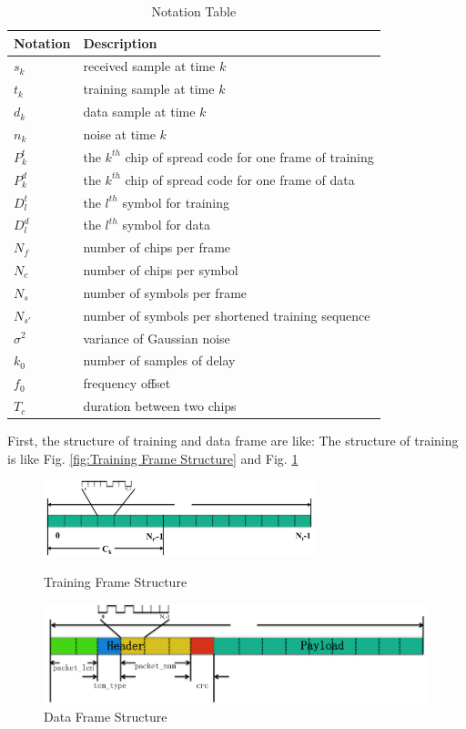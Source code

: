 \documentclass[a4paper]{article}
\begin{document}
\begin{table}[ht]
\centering
\begin{tabular}{l l}
 \toprule
 Notation 	& 	Description\\
 \midrule
 $s_k$		& 	received sample at time $k$\\
 $t_k$		& 	training sample at time $k$\\
 $d_k$		& 	data sample at time $k$\\
 $n_k$		& 	noise at time $k$\\
 $P^t_k$ & 	the $k^{th}$ chip of spread code for one frame of training\\
 $P^d_k$	& 	the $k^{th}$ chip of spread code for one frame of data\\
 $D^t_l$ & 	the $l^{th}$ symbol for training\\
 $D^d_l$ & 	the $l^{th}$ symbol for data\\
 $N_f$ 		& 	number of chips per frame\\
 $N_c$ 		& 	number of chips per symbol\\
 $N_s$		& 	number of symbols per frame\\
 $N_{s'}$ 	& 	number of symbols per shortened training sequence\\
 $\sigma^2$ & 	variance of Gaussian noise\\
 $k_0$ 		& 	number of samples of delay\\
 $f_0$ 		& 	frequency offset\\
 $T_c$ 		& 	duration between two chips\\
 \bottomrule
\end{tabular}
\caption{Notation Table}
\label{Table:Notation Table}
\end{table}

First, the structure of training and data frame are like:
The structure of training is like Fig. \ref{fig:Training Frame Structure} and Fig. \ref{fig:Data Frame Structure}
\begin{figure}[ht]
	\centering
	\includegraphics[width = 3.1in]{figure/training_frame.png}
	\caption{Training Frame Structure}
	\label{fig:Training Frame Structure}
	\includegraphics[width = 3.1 in]{figure/data_frame.png}
	\caption{Data Frame Structure}
	\label{fig:Data Frame Structure}
\end{figure}
\end{document}
